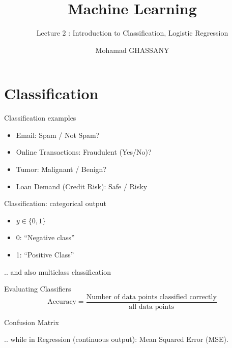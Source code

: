 \documentclass[
  9pt,
  ignorenonframetext,
  aspectratio=169,
  t, dvipsnames]{beamer}
\title{Machine Learning}
\subtitle{Lecture 2 : Introduction to Classification, Logistic
Regression}
\author{Mohamad GHASSANY}
\date{}
\institute{EFREI PARIS}
\providecommand{\tightlist}{%
  \setlength{\itemsep}{0pt}\setlength{\parskip}{0pt}}\usepackage{longtable,booktabs,array}
\theoremstyle{definition}
\begin{document}
\frame{\titlepage}
\ifdefined\Shaded\renewenvironment{Shaded}{\begin{tcolorbox}[enhanced, boxrule=0pt, borderline west={3pt}{0pt}{shadecolor}, frame hidden, sharp corners, interior hidden, breakable]}{\end{tcolorbox}}\fi

\begin{frame}
\end{frame}

\hypertarget{classification}{%
\section{Classification}\label{classification}}

\begin{frame}{Classification examples}
\protect\hypertarget{classification-examples}{}
\begin{itemize}
\tightlist
\item
  Email: Spam / Not Spam?
\item
  Online Transactions: Fraudulent (Yes/No)?
\item
  Tumor: Malignant / Benign?
\item
  Loan Demand (Credit Risk): Safe / Risky
\end{itemize}

\vspace{1cm}

\pause

\begin{exampleblock}{Classification: categorical output}

\begin{itemize}
\tightlist
\item
  \(y \in \{0,1\}\)
\item
  0: ``Negative class''
\item
  1: ``Positive Class''
\end{itemize}

\end{exampleblock}

\vspace{1cm}

\pause

.. and also multiclass classification
\end{frame}

\begin{frame}{Evaluating Classifiers}
\protect\hypertarget{evaluating-classifiers}{}
\[\text{Accuracy} = \frac{\text{Number of data points classified correctly}}{\text{all data points}}  \]

\begin{alertblock}{Confusion Matrix}

\vspace{3cm}

\end{alertblock}

.. while in Regression (continuous output): Mean Squared Error (MSE).
\end{frame}
\end{document}
